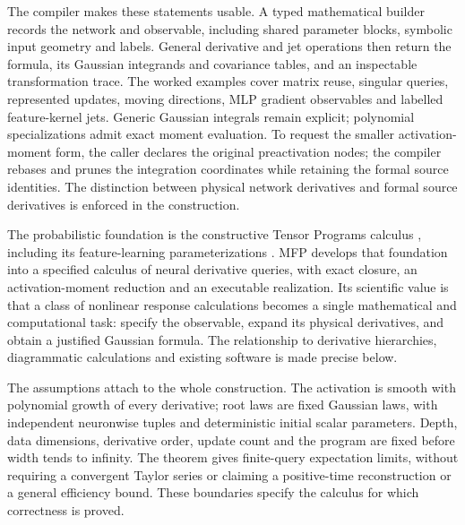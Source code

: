 The compiler makes these statements usable. A typed mathematical builder records
the network and observable, including shared parameter blocks, symbolic input
geometry and labels. General derivative and jet operations then return the
formula, its Gaussian integrands and covariance tables, and an inspectable
transformation trace. The worked examples cover matrix reuse, singular queries,
represented updates, moving directions, MLP gradient observables and labelled
feature-kernel jets. Generic Gaussian integrals remain explicit; polynomial
specializations admit exact moment evaluation. To request the smaller
activation-moment form, the caller declares the original preactivation nodes;
the compiler rebases and prunes the integration coordinates while retaining
the formal source identities. The distinction between physical
network derivatives and formal source derivatives is enforced in the construction.

The probabilistic foundation is the constructive Tensor Programs calculus
\cite{yang2021tp3,golikov2022nongaus,yang2023tp4b}, including its
feature-learning parameterizations \cite{yang2021tp4}. MFP develops that
foundation into a specified calculus of neural derivative queries, with exact
closure, an activation-moment reduction and an executable realization. Its
scientific value is that a class of nonlinear response calculations becomes a
single mathematical and computational task: specify the observable, expand its
physical derivatives, and obtain a justified Gaussian formula. The relationship
to derivative hierarchies, diagrammatic calculations and existing software is
made precise below.

The assumptions attach to the whole construction. The activation is smooth with
polynomial growth of every derivative; root laws are fixed Gaussian laws, with
independent neuronwise tuples and deterministic initial scalar parameters.
Depth, data dimensions, derivative order, update count and the program are fixed
before width tends to infinity. The theorem gives finite-query expectation
limits, without requiring a convergent Taylor series or claiming a positive-time
reconstruction or a general efficiency bound. These boundaries specify the
calculus for which correctness is proved.
